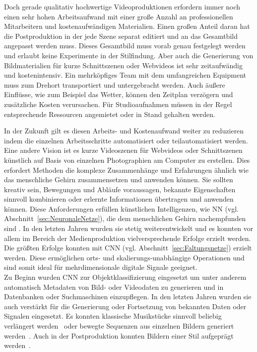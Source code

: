 \documentclass[times, 11pt,twocolumn]{article}
\begin{document}
Doch gerade qualitativ hochwertige Videoproduktionen erfordern immer noch einen sehr hohen Arbeitsaufwand mit einer große Anzahl an professionellen Mitarbeitern und kostenaufwändigen Materialien. Einen großen Anteil daran hat die Postproduktion in der jede Szene separat editiert und an das Gesamtbild angepasst werden muss. Dieses Gesamtbild muss vorab genau festgelegt werden und erlaubt keine Experimente in der Stilfindung. Aber auch die Generierung von Bildmaterialien für kurze Schnittszenen oder Webvideos ist sehr zeitaufwändig und kostenintensiv. Ein mehrköpfiges Team mit dem umfangreichen Equipment muss zum Drehort transportiert und untergebracht werden. Auch äußere Einflüsse, wie zum Beispiel das Wetter, können den Zeitplan verzögern und zusätzliche Kosten verursachen. Für Studioaufnahmen müssen in der Regel entsprechende Ressourcen angemietet oder in Stand gehalten werden.

In der Zukunft gilt es diesen Arbeits- und Kostenaufwand weiter zu reduzieren indem die einzelnen Arbeitsschritte automatisiert oder teilautomatisiert werden. Eine andere Vision ist es kurze Videoszenen für Webvideos oder Schnittszenen künstlich auf Basis von einzelnen Photographien am Computer zu erstellen. Dies erfordert Methoden die komplexe Zusammenhänge und Erfahrungen ähnlich wie das menschliche Gehirn zusammensetzen und anwenden können. Sie sollten kreativ sein, Bewegungen und Abläufe voraussagen, bekannte Eigenschaften sinnvoll kombinieren oder erlernte Informationen übertragen und anwenden können. Diese Anforderungen erfüllen künstlichen Intelligenzen, wie NN (vgl. Abschnitt~\ref{sec:NeuronaleNetze}), die dem menschlichen Gehirn nachempfunden sind \cite{McCaigDG16}. In den letzten Jahren wurden sie stetig weiterentwickelt und es konnten vor allem im Bereich der Medienproduktion vielversprechende Erfolge erzielt werden. Die größten Erfolge konnten mit CNN (vgl. Abschnitt~\ref{sec:Faltungsnetze}) erzielt werden. Diese  ermöglichen orts- und skalierungs-unabhängige Operationen und sind somit ideal für mehrdimensionale digitale Signale geeignet.\\

Zu Beginn wurden CNN zur Objektklassifizierung eingesetzt um unter anderem automatisch Metadaten von Bild- oder Videodaten zu generieren und in Datenbanken oder Suchmaschinen einzupflegen. In den letzten Jahren wurden sie auch verstärkt für die Generierung oder Fortsetzung von bekannten Daten oder Signalen eingesetzt. Es konnten klassische Musikstücke sinnvoll beliebig verlängert werden~\cite{OordDZSVGKSK16} oder bewegte Sequenzen aus einzelnen Bildern generiert werden~\cite{VondrickPT16}. Auch in der Postproduktion konnten Bildern einer Stil aufgeprägt werden~\cite{DeepDream}. \\
\end{document}

